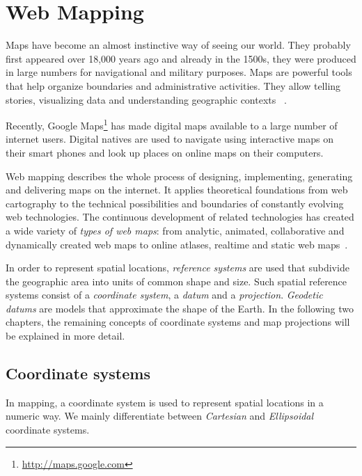 
%
%

\section{Web Mapping}

Maps have become an almost instinctive way of seeing our world. They probably first appeared over 18,000 years ago and already in the 1500s, they were produced in large numbers for navigational and military purposes. Maps are powerful tools that help organize boundaries and administrative activities. They allow telling stories, visualizing data and understanding geographic contexts
~\cite{Zzolo11mappingdrupal}.

Recently, Google Maps\footnote{\url{http://maps.google.com}} has made digital maps available to a large number of internet users. Digital natives are used to navigate using interactive maps on their smart phones and look up places on online maps on their computers.

Web mapping describes the whole process of designing, implementing, generating and delivering maps on the internet. It applies theoretical foundations from web cartography to the technical possibilities and boundaries of constantly evolving web technologies. The continuous development of related technologies has created a wide variety of \textit{types of web maps}: from analytic, animated, collaborative and dynamically created web maps to online atlases, realtime and static web maps~\cite{wiki:web-mapping}.

In order to represent spatial locations, \textit{reference systems} are used that subdivide the geographic area into units of common shape and size. Such spatial reference systems consist of a \textit{coordinate system}, a \textit{datum} and a \textit{projection}. \textit{Geodetic datums} are models that approximate the shape of the Earth. In the following two chapters, the remaining concepts of coordinate systems and map projections will be explained in more detail.

\subsection{Coordinate systems}
\label{chapter:coordinates}

In mapping, a coordinate system is used to represent spatial locations in a numeric way. We mainly differentiate between \textit{Cartesian} and \textit{Ellipsoidal} coordinate systems. 

